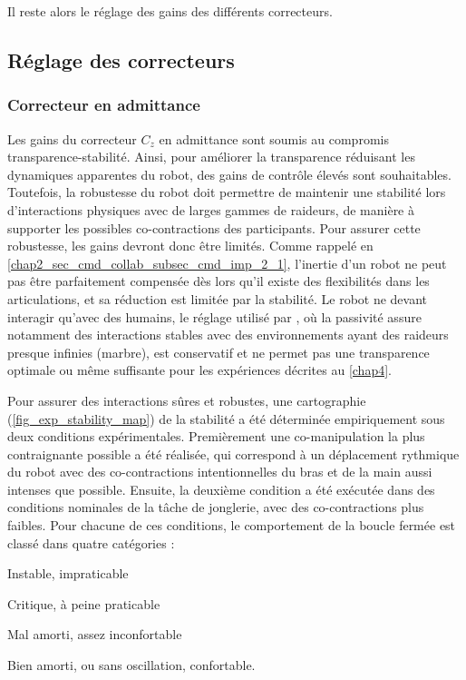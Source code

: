 Il reste alors le réglage des gains des différents correcteurs.

\subsection{Réglage des correcteurs} \label{sec_robot_sub_task_ctrl_tunning}

\subsubsection{Correcteur en admittance} \label{sec_robot_sub_task_ctrl_tunning_1}

Les gains du correcteur $ C_z $ en admittance sont soumis au compromis transparence-stabilité. Ainsi, pour améliorer la transparence réduisant les dynamiques apparentes du robot, des gains de contrôle élevés sont souhaitables. Toutefois, la robustesse du robot doit permettre de maintenir une stabilité lors d'interactions physiques avec de larges gammes de raideurs, de manière à supporter les possibles co-contractions des participants. Pour assurer cette robustesse, les gains devront donc être limités. Comme rappelé en \cref{chap2_sec_cmd_collab_subsec_cmd_imp_2_1}, l'inertie d'un robot ne peut pas être parfaitement compensée dès lors qu'il existe des flexibilités dans les articulations, et sa réduction est limitée par la stabilité. Le robot ne devant interagir qu'avec des humains, le réglage utilisé par \textcite[Chapitre~3]{lamy_conception_2011}, où la passivité assure notamment des interactions stables avec des environnements ayant des raideurs presque infinies (marbre), est conservatif et ne permet pas une transparence optimale ou même suffisante pour les expériences décrites au \cref{chap4}. 

Pour assurer des interactions sûres et robustes, une cartographie (\cref{fig_exp_stability_map}) de la stabilité a été déterminée empiriquement sous deux conditions expérimentales. Premièrement une co-manipulation la plus contraignante possible a été réalisée, qui correspond à un déplacement rythmique du robot avec des co-contractions intentionnelles du bras et de la main aussi intenses que possible. Ensuite, la deuxième condition a été exécutée dans des conditions nominales de la tâche de jonglerie, avec des co-contractions plus faibles. Pour chacune de ces conditions, le comportement de la boucle fermée est classé dans quatre catégories : 
\begin{enumerate*} [label=\roman*),itemjoin={,\quad}]
	\item Instable, impraticable
	\item Critique, à peine praticable 
	\item Mal amorti, assez inconfortable
	\item Bien amorti, ou sans oscillation, confortable.
\end{enumerate*}

